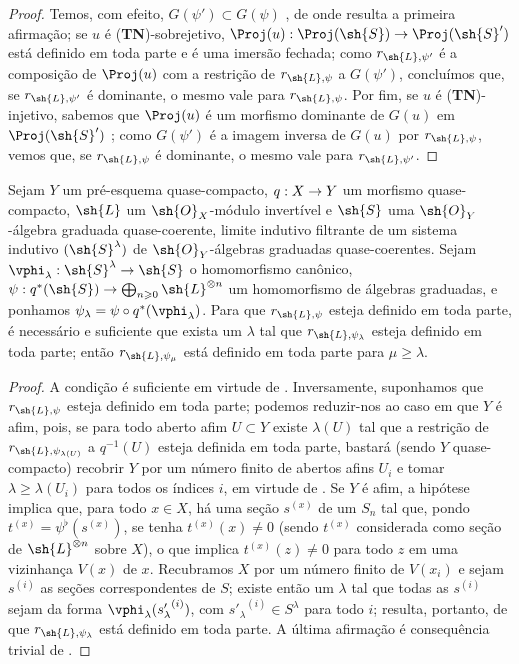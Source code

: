 \documentclass[oneside,10pt]{amsart}
\makeatletter
\renewcommand{\geq}{\geqslant}
\newcommand{\ega@arrow}[2]{\mathchoice{#1}{#2}{#2}{#2}}
\renewcommand{\to}{\ega@arrow{\longrightarrow}{\rightarrow}}
\let\EGAOriginalLabel\label
\renewcommand{\label}[1]{\phantomsection\EGAOriginalLabel{#1}}
\makeatother
\begin{document}
\begin{proof}
Temos, com efeito, $G(\psi')\subset G(\psi)$ , de onde resulta a primeira afirmação;
se $u$ é (\textbf{TN})-sobrejetivo, $\Proj(u):\Proj(\sh{S})\to\Proj(\sh{S}')$ está definido em toda parte e é uma imersão fechada;
como $r_{\sh{L},\psi'}$ é a composição de $\Proj(u)$ com a restrição de $r_{\sh{L},\psi}$ a $G(\psi')$, concluímos que, se $r_{\sh{L},\psi'}$ é dominante, o mesmo vale para $r_{\sh{L},\psi}$.
Por fim, se $u$ é (\textbf{TN})-injetivo, sabemos que $\Proj(u)$ é um morfismo dominante de $G(u)$ em $\Proj(\sh{S}')$ ;
como $G(\psi')$ é a imagem inversa de $G(u)$ por $r_{\sh{L},\psi}$, vemos que, se $r_{\sh{L},\psi}$ é dominante, o mesmo vale para $r_{\sh{L},\psi'}$.
\end{proof}

\begin{proposition}[3.7.7]
\label{II.3.7.7}
Sejam $Y$ um pré-esquema quase-compacto, $q:X\to Y$ um morfismo quase-compacto, $\sh{L}$ um $\sh{O}_X$-módulo invertível e $\sh{S}$ uma $\sh{O}_Y$-álgebra graduada quase-coerente, limite indutivo filtrante de um sistema indutivo $(\sh{S}^\lambda)$ de $\sh{O}_Y$-álgebras graduadas quase-coerentes.
Sejam $\vphi_\lambda:\sh{S}^\lambda\to\sh{S}$ o homomorfismo canônico, $\psi:q^*(\sh{S})\to\bigoplus_{n\geq0}\sh{L}^{\otimes n}$ um homomorfismo de álgebras graduadas, e ponhamos $\psi_\lambda=\psi\circ q^*(\vphi_\lambda)$.
Para que $r_{\sh{L},\psi}$ esteja definido em toda parte, é necessário e suficiente que exista um $\lambda$ tal que $r_{\sh{L},\psi_\lambda}$ esteja definido em toda parte;
então $r_{\sh{L},\psi_\mu}$ está definido em toda parte para $\mu\geq\lambda$.
\end{proposition}

\begin{proof}
A condição é suficiente em virtude de .
Inversamente, suponhamos que $r_{\sh{L},\psi}$ esteja definido em toda parte;
podemos reduzir-nos ao caso em que $Y$ é afim, pois, se para todo aberto afim $U\subset Y$ existe $\lambda(U)$ tal que a restrição de $r_{\sh{L},\psi_{\lambda(U)}}$ a $q^{-1}(U)$ esteja definida em toda parte, bastará (sendo $Y$ quase-compacto) recobrir $Y$ por um número finito de abertos afins $U_i$ e tomar $\lambda\geq\lambda(U_i)$ para todos os índices $i$, em virtude de .
Se $Y$ é afim, a hipótese implica que, para todo $x\in X$, há uma seção $s^{(x)}$ de um $S_n$ tal que, pondo $t^{(x)}=\psi^\flat(s^{(x)})$, se tenha $t^{(x)}(x)\neq0$ (sendo $t^{(x)}$ considerada como seção de $\sh{L}^{\otimes n}$ sobre $X$), o que implica $t^{(x)}(z)\neq0$ para todo $z$ em uma vizinhança $V(x)$ de $x$.
Recubramos $X$ por um número finito de $V(x_i)$ e sejam $s^{(i)}$ as seções correspondentes de $S$;
existe então um $\lambda$ tal que todas as $s^{(i)}$ sejam da forma $\vphi_\lambda({s'_\lambda}^{(i)})$, com ${s'_\lambda}^{(i)}\in S^\lambda$ para todo $i$;
resulta, portanto, de  que $r_{\sh{L},\psi_\lambda}$ está definido em toda parte.
A última afirmação é consequência trivial de .
\end{proof}
\end{document}
